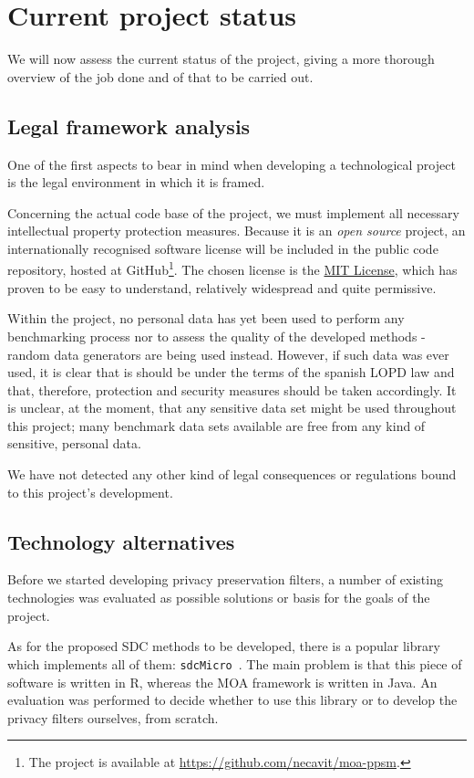 \section{Current project status}

We will now assess the current status of the project, giving a more thorough overview of the job done and of that to be carried out.

\subsection{Legal framework analysis}

One of the first aspects to bear in mind when developing a technological project is the legal environment in which it is framed.

Concerning the actual code base of the project, we must implement all necessary intellectual property protection measures. Because it is an \textit{open source} project, an internationally recognised software license will be included in the public code repository, hosted at GitHub\footnote{The project is available at \url{https://github.com/necavit/moa-ppsm}.}. The chosen license is the \href{http://opensource.org/licenses/MIT}{MIT License}, which has proven to be easy to understand, relatively widespread and quite permissive.

Within the project, no personal data has yet been used to perform any benchmarking process nor to assess the quality of the developed methods - random data generators are being used instead. However, if such data was ever used, it is clear that is should be under the terms of the spanish LOPD law and that, therefore, protection and security measures should be taken accordingly. It is unclear, at the moment, that any sensitive data set might be used throughout this project; many benchmark data sets available are free from any kind of sensitive, personal data.

We have not detected any other kind of legal consequences or regulations bound to this project's development.

\subsection{Technology alternatives}

Before we started developing privacy preservation filters, a number of existing technologies was evaluated as possible solutions or basis for the goals of the project.

As for the proposed SDC methods to be developed, there is a popular library which implements all of them: \texttt{sdcMicro}~\cite{sdcMicro}. The main problem is that this piece of software is written in R, whereas the MOA framework is written in Java. An evaluation was performed to decide whether to use this library or to develop the privacy filters ourselves, from scratch.

